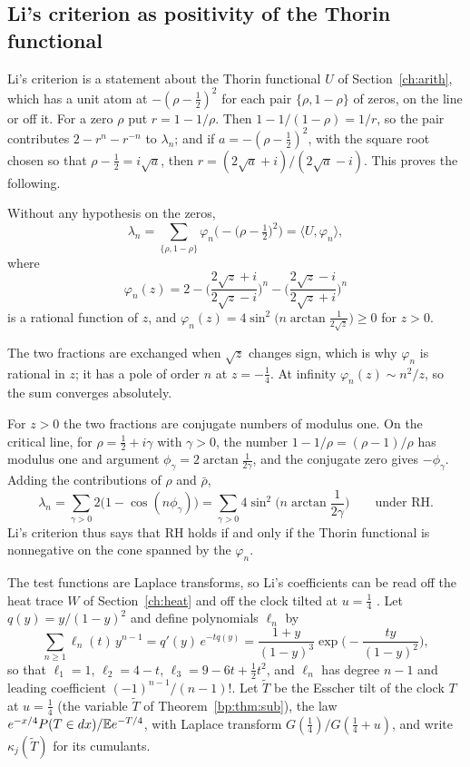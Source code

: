 \subsection{Li's criterion as positivity of the Thorin functional}\label{sec:ch20:thorin}

Li's criterion is a statement about the Thorin functional $U$ of Section~\ref{ch:arith}, which has a unit atom at $-(\rho-\frac12)^2$ for each pair $\{\rho,1-\rho\}$ of zeros, on the line or off it. For a zero $\rho$ put $r=1-1/\rho$. Then $1-1/(1-\rho)=1/r$, so the pair contributes $2-r^n-r^{-n}$ to $\lambda_n$; and if $a=-(\rho-\frac12)^2$, with the square root chosen so that $\rho-\frac12=i\sqrt a$, then $r=(2\sqrt a+i)/(2\sqrt a-i)$. This proves the following.

\begin{proposition}\label{prop:ch20:thorin}
Without any hypothesis on the zeros,
\[
\lambda_n=\sum_{\{\rho,1-\rho\}}\varphi_n\Big(-\big(\rho-\tfrac12\big)^2\Big)=\langle U,\varphi_n\rangle,
\]
where
\[
\varphi_n(z)=2-\Big(\frac{2\sqrt z+i}{2\sqrt z-i}\Big)^n-\Big(\frac{2\sqrt z-i}{2\sqrt z+i}\Big)^n
\]
is a rational function of $z$, and $\varphi_n(z)=4\sin^2\big(n\arctan\frac1{2\sqrt z}\big)\ge0$ for $z>0$.
\end{proposition}

The two fractions are exchanged when $\sqrt z$ changes sign, which is why $\varphi_n$ is rational in $z$; it has a pole of order $n$ at $z=-\frac14$. At infinity $\varphi_n(z)\sim n^2/z$, so the sum converges absolutely.

For $z>0$ the two fractions are conjugate numbers of modulus one. On the critical line, for $\rho=\frac12+i\gamma$ with $\gamma>0$, the number $1-1/\rho=(\rho-1)/\rho$ has modulus one and argument $\phi_\gamma=2\arctan\frac1{2\gamma}$, and the conjugate zero gives $-\phi_\gamma$. Adding the contributions of $\rho$ and $\bar\rho$,
\[
\lambda_n=\sum_{\gamma>0}2\big(1-\cos(n\phi_\gamma)\big)=\sum_{\gamma>0}4\sin^2\Big(n\arctan\frac1{2\gamma}\Big)\qquad\text{under RH}.
\]
Li's criterion thus says that RH holds if and only if the Thorin functional is nonnegative on the cone spanned by the $\varphi_n$.

The test functions are Laplace transforms, so Li's coefficients can be read off the heat trace $W$ of Section~\ref{ch:heat} and off the clock tilted at $u=\frac14$ \cite{P26pg3}. Let $q(y)=y/(1-y)^2$ and define polynomials $\ell_n$ by
\[
\sum_{n\ge1}\ell_n(t)\,y^{n-1}=q'(y)\,e^{-tq(y)}=\frac{1+y}{(1-y)^3}\exp\Big(-\frac{ty}{(1-y)^2}\Big),
\]
so that $\ell_1=1$, $\ell_2=4-t$, $\ell_3=9-6t+\frac12t^2$, and $\ell_n$ has degree $n-1$ and leading coefficient $(-1)^{n-1}/(n-1)!$. Let $\widetilde T$ be the Esscher tilt of the clock $T$ at $u=\frac14$ (the variable $\widetilde T$ of Theorem~\ref{bp:thm:sub}), the law $e^{-x/4}P(T\in dx)/\mathbb{E} e^{-T/4}$, with Laplace transform $G(\frac14)/G(\frac14+u)$, and write $\kappa_j(\widetilde T)$ for its cumulants.

